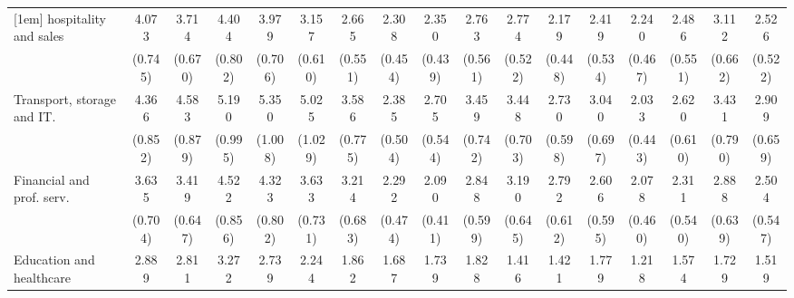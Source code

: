 {\begin{tabular}{l*{16}{c}}
[1em]
hospitality and sales&       4.073\sym{***}&       3.714\sym{***}&       4.404\sym{***}&       3.979\sym{***}&       3.157\sym{***}&       2.665\sym{***}&       2.308\sym{***}&       2.350\sym{***}&       2.763\sym{***}&       2.774\sym{***}&       2.179\sym{***}&       2.419\sym{***}&       2.240\sym{***}&       2.486\sym{***}&       3.112\sym{***}&       2.526\sym{***}\\
                    &     (0.745)         &     (0.670)         &     (0.802)         &     (0.706)         &     (0.610)         &     (0.551)         &     (0.454)         &     (0.439)         &     (0.561)         &     (0.522)         &     (0.448)         &     (0.534)         &     (0.467)         &     (0.551)         &     (0.662)         &     (0.522)         \\
[1em]
Transport, storage and IT.&       4.366\sym{***}&       4.583\sym{***}&       5.190\sym{***}&       5.350\sym{***}&       5.025\sym{***}&       3.586\sym{***}&       2.385\sym{***}&       2.705\sym{***}&       3.459\sym{***}&       3.448\sym{***}&       2.730\sym{***}&       3.040\sym{***}&       2.033\sym{**} &       2.620\sym{***}&       3.431\sym{***}&       2.909\sym{***}\\
                    &     (0.852)         &     (0.879)         &     (0.995)         &     (1.008)         &     (1.029)         &     (0.775)         &     (0.504)         &     (0.544)         &     (0.742)         &     (0.703)         &     (0.598)         &     (0.697)         &     (0.443)         &     (0.610)         &     (0.790)         &     (0.659)         \\
[1em]
Financial and prof. serv.&       3.635\sym{***}&       3.419\sym{***}&       4.522\sym{***}&       4.323\sym{***}&       3.633\sym{***}&       3.214\sym{***}&       2.292\sym{***}&       2.090\sym{***}&       2.848\sym{***}&       3.190\sym{***}&       2.792\sym{***}&       2.606\sym{***}&       2.078\sym{***}&       2.311\sym{***}&       2.888\sym{***}&       2.504\sym{***}\\
                    &     (0.704)         &     (0.647)         &     (0.856)         &     (0.802)         &     (0.731)         &     (0.683)         &     (0.474)         &     (0.411)         &     (0.599)         &     (0.645)         &     (0.612)         &     (0.595)         &     (0.460)         &     (0.540)         &     (0.639)         &     (0.547)         \\
[1em]
Education and healthcare&       2.889\sym{***}&       2.811\sym{***}&       3.272\sym{***}&       2.739\sym{***}&       2.244\sym{***}&       1.862\sym{**} &       1.687\sym{*}  &       1.739\sym{*}  &       1.828\sym{**} &       1.416         &       1.421         &       1.779\sym{*}  &       1.218         &       1.574         &       1.729\sym{*}  &       1.519         \\

\end{tabular}}
